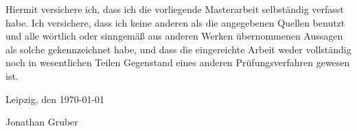 
Hiermit versichere ich, dass ich die vorliegende Masterarbeit selbständig verfasst habe. Ich versichere, dass ich keine anderen als die angegebenen Quellen benutzt und alle wörtlich oder sinngemäß aus anderen Werken übernommenen Aussagen als solche gekennzeichnet habe, und dass die eingereichte Arbeit weder vollständig noch in wesentlichen Teilen Gegenstand eines anderen Prüfungsverfahren gewesen ist.

Leipzig, den \today
\vspace{0.5cm}

\makebox[4cm]{\hrulefill}
\newline\vspace{1cm}
Jonathan Gruber
